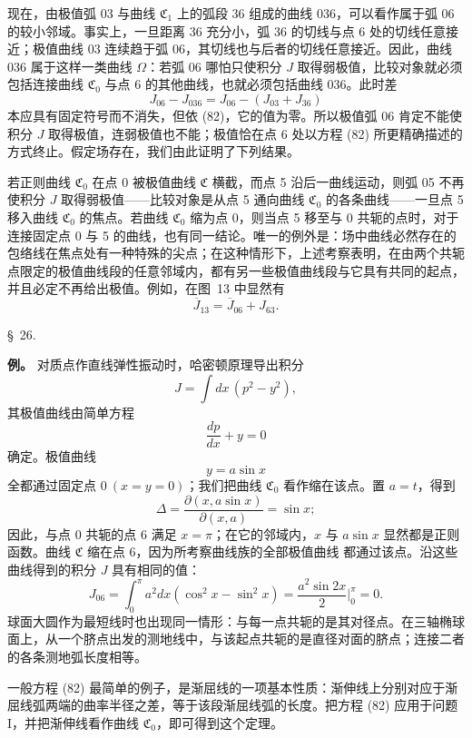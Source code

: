 \documentclass[11pt,a4paper,leqno]{article}
\begin{document}
现在，由极值弧 03 与曲线 $\mathfrak{C}_1$ 上的弧段 36 组成的曲线 036，可以看作属于弧 06 的较小邻域。事实上，一旦距离 36 充分小，弧 36 的切线与点 6 处的切线任意接近；极值曲线 03 连续趋于弧 06，其切线也与后者的切线任意接近。因此，曲线 036 属于这样一类曲线 $\Omega$：若弧 06 哪怕只使积分 $J$ 取得弱极值，比较对象就必须包括连接曲线 $\mathfrak{C}_0$ 与点 6 的其他曲线，也就必须包括曲线 036。此时差
\[
J_{06}-J_{036}=J_{06}-(J_{03}+J_{36})
\]
本应具有固定符号而不消失，但依 (82)，它的值为零。所以极值弧 06 肯定不能使积分 $J$ 取得极值，连弱极值也不能；极值恰在点 6 处以方程 (82) 所更精确描述的方式终止。假定场存在，我们由此证明了下列结果。

若正则曲线 $\mathfrak{C}_0$ 在点 0 被极值曲线 $\mathfrak{C}$ 横截，而点 5 沿后一曲线运动，则弧 05 不再使积分 $J$ 取得弱极值——比较对象是从点 5 通向曲线 $\mathfrak{C}_0$ 的各条曲线——一旦点 5 移入曲线 $\mathfrak{C}_0$ 的焦点。若曲线 $\mathfrak{C}_0$ 缩为点 0，则当点 5 移至与 0 共轭的点时，对于连接固定点 0 与 5 的曲线，也有同一结论。唯一的例外是：场中曲线必然存在的包络线在焦点处有一种特殊的尖点；在这种情形下，上述考察表明，在由两个共轭点限定的极值曲线段的任意邻域内，都有另一些极值曲线段与它具有共同的起点，并且必定不再给出极值。例如，在图~13 中显然有
\[
\overline{J}_{13}=\overline{J}_{06}+J_{63}.
\]

\begin{center}{\large \S~26.}\end{center}

\noindent\textbf{例。} 对质点作直线弹性振动时，哈密顿原理导出积分
\[
J=\int dx\,(p^2-y^2),
\]
其极值曲线由简单方程
\[
\frac{dp}{dx}+y=0
\]
确定。极值曲线
\[
y=a\sin x
\]
全都通过固定点 $0\ (x=y=0)$；我们把曲线 $\mathfrak{C}_0$ 看作缩在该点。置 $a=t$，得到
\[
\Delta=\frac{\partial(x,a\sin x)}{\partial(x,a)}=\sin x;
\]
因此，与点 0 共轭的点 6 满足 $x=\pi$；在它的邻域内，$x$ 与 $a\sin x$ 显然都是正则函数。曲线 $\mathfrak{C}$ 缩在点 6，因为所考察曲线族的全部极值曲线
都通过该点。沿这些曲线得到的积分 $J$ 具有相同的值：
\[
J_{06}=\int_0^\pi a^2dx(\cos^2x-\sin^2x)
=\frac{a^2\sin2x}{2}\bigg|_0^\pi=0.
\]
球面大圆作为最短线时也出现同一情形：与每一点共轭的是其对径点。在三轴椭球面上，从一个脐点出发的测地线中，与该起点共轭的是直径对面的脐点；连接二者的各条测地弧长度相等。

一般方程 (82) 最简单的例子，是渐屈线的一项基本性质：渐伸线上分别对应于渐屈线弧两端的曲率半径之差，等于该段渐屈线弧的长度。把方程 (82) 应用于问题 I，并把渐伸线看作曲线 $\mathfrak{C}_0$，即可得到这个定理。
\end{document}
